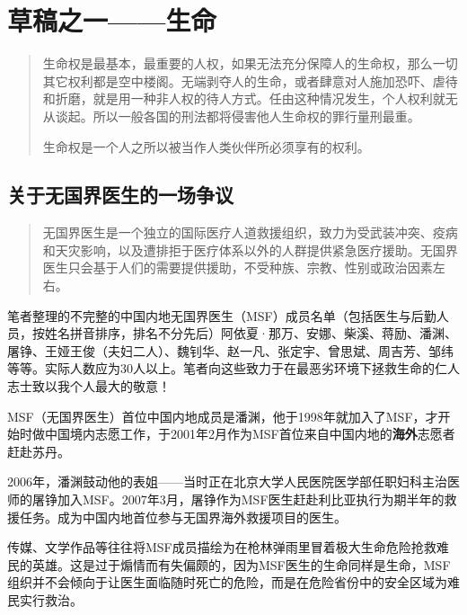 \chapter{草稿之一——生命}

\begin{quotation}

  生命权是最基本，最重要的人权，如果无法充分保障人的生命权，那么一切其它权利都是空中楼阁。无端剥夺人的生命，或者肆意对人施加恐吓、虐待和折磨，就是用一种非人权的待人方式。任由这种情况发生，个人权利就无从谈起。所以一般各国的刑法都将侵害他人生命权的罪行量刑最重。

  生命权是一个人之所以被当作人类伙伴所必须享有的权利。\cite{renquanwiki}
\end{quotation}

\section{关于无国界医生的一场争议}

\begin{quotation}

  无国界医生是一个独立的国际医疗人道救援组织，致力为受武装冲突、疫病和天灾影响，以及遭排拒于医疗体系以外的人群提供紧急医疗援助。无国界医生只会基于人们的需要提供援助，不受种族、宗教、性别或政治因素左右。
\end{quotation}

笔者整理的不完整的中国内地无国界医生（MSF）成员名单（包括医生与后勤人员，按姓名拼音排序，排名不分先后）阿依夏·那万、安娜、柴溪、蒋励、潘渊、屠铮、王娅王俊（夫妇二人）、魏钊华、赵一凡、张定宇、曾思斌、周吉芳、邹纬等等。实际人数应为30人以上。笔者向这些致力于在最恶劣环境下拯救生命的仁人志士致以我个人最大的敬意！

MSF（无国界医生）首位中国内地成员是潘渊，他于1998年就加入了MSF，才开始时做中国境内志愿工作，于2001年2月作为MSF首位来自中国内地的\textbf{海外}志愿者赶赴苏丹。\cite{panyuan}

2006年，潘渊鼓动他的表姐——当时正在北京大学人民医院医学部任职妇科主治医师的屠铮加入MSF。2007年3月，屠铮作为MSF医生赶赴利比亚执行为期半年的救援任务。成为中国内地首位参与无国界海外救援项目的医生。\cite{tuzheng} 

传媒、文学作品等往往将MSF成员描绘为在枪林弹雨里冒着极大生命危险抢救难民的英雄。这是过于煽情而有失偏颇的，因为MSF医生的生命同样是生命，MSF组织并不会倾向于让医生面临随时死亡的危险，而是在危险省份中的安全区域为难民实行救治。

